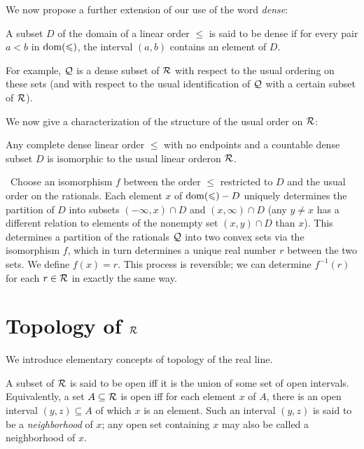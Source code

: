 We now propose a further extension of our use of the word {\itshape
dense\/}:

\begin{definition}
 A subset $D$ of the domain of a linear order $\leq$
 is said to be {\upshape dense} if for every pair $a < b$ in $\mathop{\mathrm{dom}}(\leqslant)$, the
 interval $(a,b)$ contains an element of $D$.
\end{definition}

For example, ${\cal Q}$ is a dense subset of $\cal R$ with respect to
the usual ordering on these sets (and with respect to the usual
identification of $\cal Q$ with a certain subset of $\cal R$).

We now give a characterization of the structure of the usual order on
$\cal R$:

\begin{thm}
 Any complete dense linear order $\leq$ with no
 endpoints and a countable dense subset $D$ is isomorphic to the usual linear order\linebreak on $\cal R$.
\end{thm}

\preuve\ Choose an isomorphism $f$ between the order $\leq$
restricted to $D$ and the usual order on the rationals.  Each element 
$x$ of $\mathop{\mathrm{dom}}(\leqslant)-D$ uniquely determines the partition of $D$
into subsets $(-\infty,x)\cap D$ and $(x,\infty) \cap D$ (any $y \neq x$
has a different relation to elements of the nonempty set $(x,y)\cap D$
than $x$).  This determines a partition of the rationals $\cal Q$ into
two convex sets via the isomorphism $f$, which in turn determines a
unique real number $r$ between the two sets.  We define
$f(x) = r$. This process is reversible; we can determine $f^{-1}(r)$ for each
$r \in {\cal R}$ in exactly the same way.
\finpreuve




\section[Topology of ${\cal R}$]{Topology of ${\cal R}$}

We introduce elementary concepts of topology of the real line.

\begin{definition}
 A subset of $\cal R$ is said to be {\upshape open\/} iff
 it is the union of some set of open intervals.  Equivalently, a set $A
 \subseteq {\cal R}$ is open iff for each element $x$ of $A$, there is
 an open interval $(y,z) \subseteq A$ of which $x$ is an element.  Such
 an interval $(y,z)$ is said to be a {\em neighborhood\/} of $x$; any
 open set containing $x$ may also be called a neighborhood of $x$.
\end{definition}

